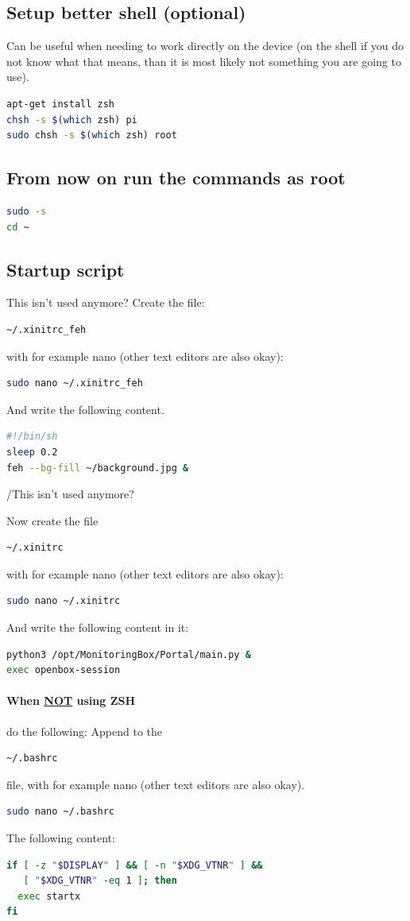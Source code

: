 \documentclass[11pt]{report}
\begin{document}
		\subsection{Setup better shell (optional)}
			Can be useful when needing to work directly on the device (on the shell if you do not know what that means, than it is most likely not something you are going to use).
			\begin{lstlisting}[language=sh]
apt-get install zsh
chsh -s $(which zsh) pi
sudo chsh -s $(which zsh) root
			\end{lstlisting}
		\subsection{From now on run the commands as root}
		\begin{lstlisting}[language=sh]
sudo -s
cd ~
		\end{lstlisting}
		\subsection{Startup script}
		This isn't used anymore?
			Create the file: 
			\begin{lstlisting}[language=sh]
~/.xinitrc_feh
			\end{lstlisting}
			with for example nano (other text editors are also okay):
			\begin{lstlisting}[language=sh]
sudo nano ~/.xinitrc_feh
			\end{lstlisting}
			And write the following content.
			\begin{lstlisting}[language=sh]
#!/bin/sh
sleep 0.2
feh --bg-fill ~/background.jpg &
			\end{lstlisting}
		/This isn't used anymore?

			Now create the file
			\begin{lstlisting}[language=sh]
~/.xinitrc
			\end{lstlisting}
			with for example nano (other text editors are also okay):
			\begin{lstlisting}[language=sh]
sudo nano ~/.xinitrc
			\end{lstlisting}
			And write the following content in it:
			\begin{lstlisting}[language=sh]
python3 /opt/MonitoringBox/Portal/main.py &
exec openbox-session
\end{lstlisting}
			\paragraph{When \underline{NOT} using ZSH} do the following:
				Append to the
				\begin{lstlisting}[language=sh]
~/.bashrc
				\end{lstlisting}
				file, with for example nano (other text editors are also okay).
				\begin{lstlisting}[language=sh]
sudo nano ~/.bashrc
				\end{lstlisting}
				The following content:
				\begin{lstlisting}[language=sh]
if [ -z "$DISPLAY" ] && [ -n "$XDG_VTNR" ] && 
   [ "$XDG_VTNR" -eq 1 ]; then
  exec startx
fi
				\end{lstlisting}
\end{document}
